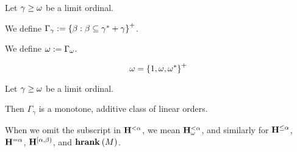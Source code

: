 \begin{definition}
  Let $\gamma \ge \omega$ be a limit ordinal.

  We define $\Gamma_{\gamma} := \left\{ {\beta : \beta \subseteq \gamma^\ast + \gamma} \right\}^+$.

  We define $\omega := \Gamma_{\omega}$.
\end{definition}

\begin{example}
  \[
    \omega = \left\{ {1, \omega, \omega^\ast} \right\}^+
  \]
\end{example}

\begin{observation}
  Let $\gamma \ge \omega$ be a limit ordinal.

  Then $\Gamma_{\gamma}$ is a monotone, additive class of linear orders.
\end{observation}


\begin{notation}
  When we omit the subscript in $\mathbf{H}_{}^{< \alpha}$,
  we mean $\mathbf{H}_{\omega}^{< \alpha}$,
  and similarly for $\mathbf{H}_{}^{\le \alpha}$, $\mathbf{H}_{}^{= \alpha}$, $\mathbf{H}_{}^{[\alpha, \beta)}$,
  and $\mathbf{hrank}_{} \left( {M} \right)$.
\end{notation}